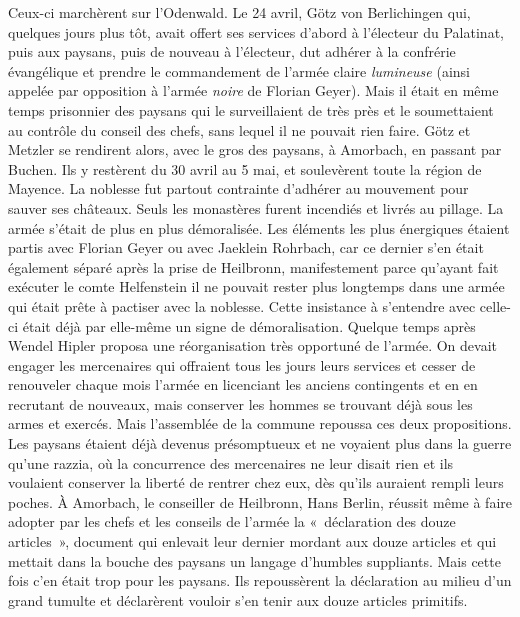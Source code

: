 \documentclass[french,twoside]{book} %
\begin{document}
Ceux-ci marchèrent sur l’Odenwald. Le 24 avril, Götz von Berlichingen qui, quelques jours plus tôt, avait offert ses services d’abord à l’électeur du Palatinat, puis aux paysans, puis de nouveau à l’électeur, dut adhérer à la confrérie évangélique et prendre le commandement de l’armée claire \emph{lumineuse} (ainsi appelée par opposition à l’armée \emph{noire} de Florian Geyer). Mais il était en même temps prisonnier des paysans qui le surveillaient de très près et le soumettaient au contrôle du conseil des chefs, sans lequel il ne pouvait rien faire. Götz et Metzler se rendirent alors, avec le gros des paysans, à Amorbach, en passant par Buchen. Ils y restèrent du 30 avril au 5 mai, et soulevèrent toute la région de Mayence. La noblesse fut partout contrainte d’adhérer au mouvement pour sauver ses châteaux. Seuls les monastères furent incendiés et livrés au pillage. La armée s’était de plus en plus démoralisée. Les éléments les plus énergiques étaient partis avec Florian Geyer ou avec Jaeklein Rohrbach, car ce dernier s’en était également séparé après la prise de Heilbronn, manifestement parce qu’ayant fait exécuter le comte Helfenstein il ne pouvait rester plus longtemps dans une armée qui était prête à pactiser avec la noblesse. Cette insistance à s’entendre avec celle-ci était déjà par elle-même un signe de démoralisation. Quelque temps après Wendel Hipler proposa une réorganisation très opportuné de l’armée. On devait engager les mercenaires qui offraient tous les jours leurs services et cesser de renouveler chaque mois l’armée en licenciant les anciens contingents et en en recrutant de nouveaux, mais conserver les hommes se trouvant déjà sous les armes et exercés. Mais l’assemblée de la commune repoussa ces deux propositions. Les paysans étaient déjà devenus présomptueux et ne voyaient plus dans la guerre qu’une razzia, où la concurrence des mercenaires ne leur disait rien et ils voulaient conserver la liberté de rentrer chez eux, dès qu’ils auraient rempli leurs poches. À Amorbach, le conseiller de Heilbronn, Hans Berlin, réussit même à faire adopter par les chefs et les conseils de l’armée la « déclaration des douze articles », document qui enlevait leur dernier mordant aux douze articles et qui mettait dans la bouche des paysans un langage d’humbles suppliants. Mais cette fois c’en était trop pour les paysans. Ils repoussèrent la déclaration au milieu d’un grand tumulte et déclarèrent vouloir s’en tenir aux douze articles primitifs.\par
\end{document}

